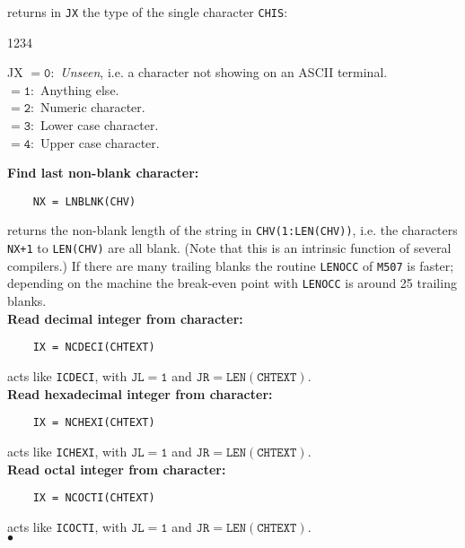 returns in {\tt JX} the type of the single character {\tt CHIS}:
\begin{DLtt}{1234}
\item[JX] $\mathtt{= 0:}$ {\it Unseen}, i.e. a character not showing on
an ASCII terminal. \\
$\mathtt{= 1:}$ Anything else. \\
$\mathtt{= 2:}$ Numeric character. \\
$\mathtt{= 3:}$ Lower case character. \\
$\mathtt{= 4:}$ Upper case character.
\end{DLtt}
{\bf Find last non-blank character:}
\begin{verbatim}
    NX = LNBLNK(CHV)
\end{verbatim}
returns the non-blank length of the string in {\tt CHV(1:LEN(CHV))},
i.e. the characters {\tt NX+1} to {\tt LEN(CHV)} are all blank.
(Note that this is an intrinsic function of several compilers.)
If there are many trailing blanks the routine {\tt LENOCC}
of {\tt M507} is faster; depending on the machine the break-even
point with {\tt LENOCC} is around 25 trailing blanks. \\[2mm]
\newpage
{\bf Read decimal integer from character:}
\begin{verbatim}
    IX = NCDECI(CHTEXT)
\end{verbatim}
acts like {\tt ICDECI},
with $\mathtt{JL=1}$ and $\mathtt{JR=LEN(CHTEXT)}$. \\[2mm]
{\bf Read hexadecimal integer from character:}
\begin{verbatim}
    IX = NCHEXI(CHTEXT)
\end{verbatim}
acts like {\tt ICHEXI},
with $\mathtt{JL=1}$ and $\mathtt{JR=LEN(CHTEXT)}$. \\[2mm]
{\bf Read octal integer from character:}
\begin{verbatim}
    IX = NCOCTI(CHTEXT)
\end{verbatim}
acts like {\tt ICOCTI},
with $\mathtt{JL=1}$ and $\mathtt{JR=LEN(CHTEXT)}$. \\[2mm]
$\bullet$
